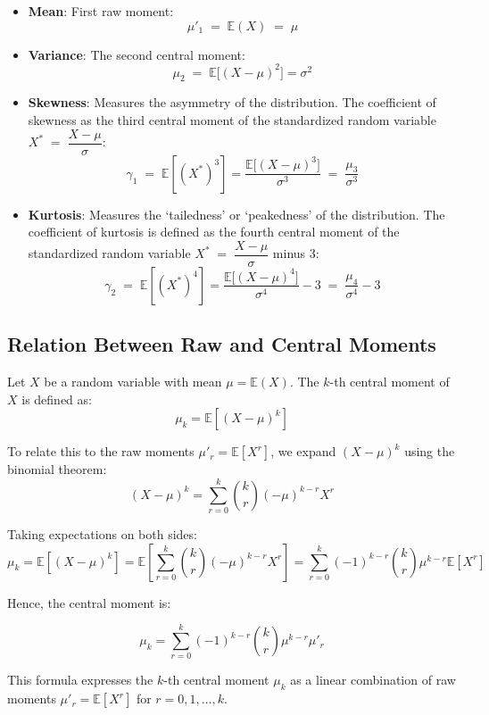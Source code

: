 \documentclass[twoside]{book}
\begin{document}
\begin{itemize}
\item \textbf{Mean}: First raw moment:
    \[
      \mu'_1 \;=\; \mathbb{E}(X) \;=\;\mu
    \]
  \item \textbf{Variance}: The second central moment:
    \[
      \mu_2 \;=\; \mathbb{E}\bigl[(X-\mu)^2\bigr] = \sigma^2
    \]
  \item \textbf{Skewness}:
    Measures the asymmetry of the distribution. The coefficient of skewness as the third central moment of the standardized random variable $X^* \;=\; \dfrac{X - \mu}{\sigma}$:
    \[
      \gamma_1
      \;=\;\mathbb{E}\left[(X^*)^3\right]=
      \frac{\mathbb{E}\bigl[(X-\mu)^3\bigr]}{\sigma^3}
      \;=\;
      \frac{\mu_3}{\sigma^3}
    \]
  \item \textbf{Kurtosis}:
    Measures the `tailedness' or `peakedness' of the distribution. The coefficient of kurtosis is
    defined as the fourth central moment of the standardized random variable $X^* \;=\; \dfrac{X - \mu}{\sigma}$ minus 3:
    \[
      \gamma_2
      \;=\;\mathbb{E}\left[(X^*)^4\right]=
      \frac{\mathbb{E}\bigl[(X-\mu)^4\bigr]}{\sigma^4} - 3
      \;=\;
      \frac{\mu_4}{\sigma^4} - 3
    \]
\end{itemize}

\subsection{Relation Between Raw and Central Moments}

Let \(X\) be a random variable with mean \(\mu = \mathbb{E}(X)\). The $k$-th {central moment} of \(X\) is defined as:
\[
\mu_k = \mathbb{E}[(X - \mu)^k]
\]

To relate this to the raw moments \(\mu'_r = \mathbb{E}[X^r]\), we expand \((X - \mu)^k\) using the binomial theorem:
\[
(X - \mu)^k = \sum_{r=0}^{k} \binom{k}{r} (-\mu)^{k - r} X^r
\]

Taking expectations on both sides:
\[
\mu_k = \mathbb{E}[(X - \mu)^k]
= \mathbb{E}\left[\sum_{r=0}^{k} \binom{k}{r} (-\mu)^{k - r} X^r\right]
= \sum_{r=0}^{k} (-1)^{k - r}\binom{k}{r} \mu^{k - r} \mathbb{E}[X^r]
\]

Hence, the central moment is:
\begin{textbox}
    \[
\mu_k = \sum_{r=0}^{k} (-1)^{k - r} \binom{k}{r} \mu^{k - r} \mu'_r
\]
\end{textbox}

This formula expresses the $k$-th central moment \(\mu_k\) as a linear combination of raw moments \(\mu'_r = \mathbb{E}[X^r]\) for \(r = 0, 1, \ldots, k\).
\end{document}
